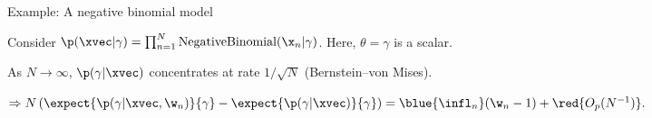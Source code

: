 \begin{frame}[t]{Example: A negative binomial model}


Consider $\p(\xvec \vert \gamma) = \prod_{n=1}^N \textrm{NegativeBinomial}(\x_n \vert \gamma)$. Here, $\theta = \gamma$ is a scalar.  

\pause
As $N \rightarrow \infty$, $\p(\gamma \vert \xvec)$ concentrates at rate $1 / \sqrt{N}$ (Bernstein--von Mises).

$\Rightarrow 
N \left( \expect{\p(\gamma \vert \xvec, \w_n)}{\gamma} -
\expect{\p(\gamma \vert \xvec)}{\gamma} \right) = \blue{\infl_n} (\w_n - 1) + \red{O_p(N^{-1})}.
$


\pause
\vspace{1.5em}
\LowDimAccuracyGraph{}

\pause
{}

\end{frame}
